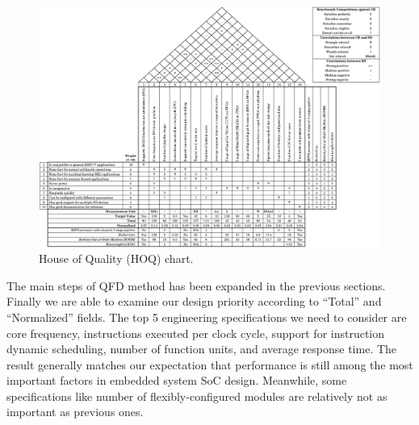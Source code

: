 \begin{figure}[!htp]
    \centering
    \includegraphics[width=\linewidth]{figure/qfd.png}
    \caption{House of Quality (HOQ) chart.}
    \label{qfd}
\end{figure}

The main steps of QFD method has been expanded in the previous sections. Finally we are able to examine our design priority according to ``Total'' and ``Normalized'' fields. The top 5 engineering specifications we need to consider are core frequency, instructions executed per clock cycle, support for instruction dynamic scheduling, number of function units, and average response time. The result generally matches our expectation that performance is still among the most important factors in embedded system SoC design. Meanwhile, some specifications like number of flexibly-configured modules are relatively not as important as previous ones.
